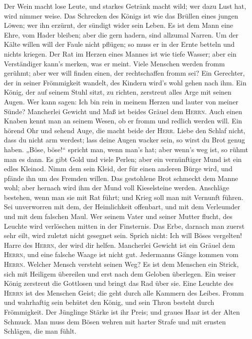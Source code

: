  Der Wein macht lose Leute, und starkes Getränk macht
wild; wer dazu Lust hat, wird nimmer weise.  Das Schrecken
des Königs ist wie das Brüllen eines jungen Löwen; wer ihn erzürnt, der
sündigt wider sein Leben.  Es ist dem Mann eine Ehre, vom
Hader bleiben; aber die gern hadern, sind allzumal Narren.
 Um der Kälte willen will der Faule nicht pflügen; so muss
er in der Ernte betteln und nichts kriegen.  Der Rat im
Herzen eines Mannes ist wie tiefe Wasser; aber ein Verständiger kann's
merken, was er meint.  Viele Menschen werden fromm
gerühmt; aber wer will finden einen, der rechtschaffen fromm sei?
 Ein Gerechter, der in seiner Frömmigkeit wandelt, des
Kindern wird's wohl gehen nach ihm.  Ein König, der auf
seinem Stuhl sitzt, zu richten, zerstreut alles Arge mit seinen Augen.
 Wer kann sagen: Ich bin rein in meinem Herzen und lauter
von meiner Sünde?  Mancherlei Gewicht und Maß ist beides
Gräuel dem \textsc{Herrn}.  Auch einen Knaben kennt man
an seinem Wesen, ob er fromm und redlich werden will. 
Ein hörend Ohr und sehend Auge, die macht beide der \textsc{Herr}.
 Liebe den Schlaf nicht, dass du nicht arm werdest; lass
deine Augen wacker sein, so wirst du Brot genug haben. 
„Böse, böse!{}`` spricht man, wenn man's hat; aber wenn's weg ist, so
rühmt man es dann.  Es gibt Gold und viele Perlen; aber
ein vernünftiger Mund ist ein edles Kleinod.  Nimm dem
sein Kleid, der für einen anderen Bürge wird, und pfände ihn um des
Fremden willen.  Das gestohlene Brot schmeckt dem Manne
wohl; aber hernach wird ihm der Mund voll Kieselsteine werden.
 Anschläge bestehen, wenn man sie mit Rat führt; und
Krieg soll man mit Vernunft führen.  Sei unverworren mit
dem, der Heimlichkeit offenbart, und mit dem Verleumder und mit dem
falschen Maul.  Wer seinem Vater und seiner Mutter
flucht, des Leuchte wird verlöschen mitten in der Finsternis.
 Das Erbe, darnach man zuerst sehr eilt, wird zuletzt
nicht gesegnet sein.  Sprich nicht: Ich will Böses
vergelten! Harre des \textsc{Herrn}, der wird dir helfen.
 Mancherlei Gewicht ist ein Gräuel dem \textsc{Herrn},
und eine falsche Waage ist nicht gut.  Jedermanns Gänge
kommen vom \textsc{Herrn}. Welcher Mensch versteht seinen Weg?
 Es ist dem Menschen ein Strick, sich mit Heiligem
übereilen und erst nach dem Geloben überlegen.  Ein
weiser König zerstreut die Gottlosen und bringt das Rad über sie.
 Eine Leuchte des \textsc{Herrn} ist des Menschen Geist;
die geht durch alle Kammern des Leibes.  Fromm und
wahrhaftig sein behütet den König, und sein Thron besteht durch
Frömmigkeit.  Der Jünglinge Stärke ist ihr Preis; und
graues Haar ist der Alten Schmuck.  Man muss dem Bösen
wehren mit harter Strafe und mit ernsten Schlägen, die man fühlt.


